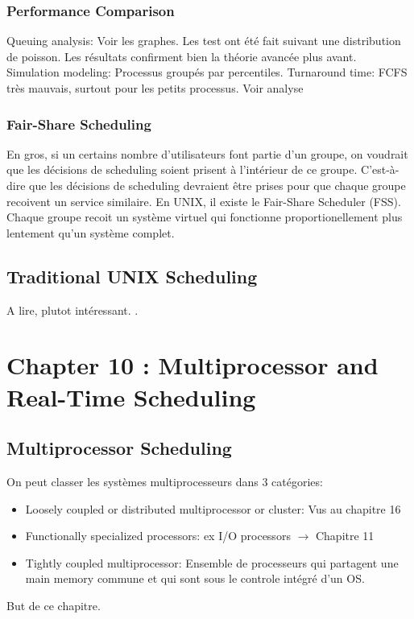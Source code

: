 \subsubsection{Performance Comparison}
Queuing analysis: Voir les graphes.
Les test ont été fait suivant une distribution de poisson.
Les résultats confirment bien la théorie avancée plus avant.
Simulation modeling: Processus groupés par percentiles.
Turnaround time: FCFS très mauvais, surtout pour les petits processus.
Voir analyse \cite[p.~420]{stallings}

\subsubsection{Fair-Share Scheduling}
En gros, si un certains nombre d'utilisateurs font partie d'un groupe, on voudrait que les décisions de scheduling soient prisent à l'intérieur de ce groupe.
C'est-à-dire que les décisions de scheduling devraient être prises pour que chaque groupe recoivent un service similaire.
En UNIX, il existe le Fair-Share Scheduler (FSS).
Chaque groupe recoit un système virtuel qui fonctionne proportionellement plus lentement qu'un système complet.

\subsection{Traditional UNIX Scheduling}
A lire, plutot intéressant.
\cite[p.~423]{stallings}.

\newpage


\section{Chapter 10 : Multiprocessor and Real-Time Scheduling}

\subsection{Multiprocessor Scheduling}
On peut classer les systèmes multiprocesseurs dans 3 catégories:
\begin{itemize}
  \item Loosely coupled or distributed multiprocessor or cluster: Vus au chapitre 16
  \item Functionally specialized processors: ex I/O processors $\to$ Chapitre 11
  \item Tightly coupled multiprocessor: Ensemble de processeurs qui partagent une main memory commune et qui sont sous le controle intégré d'un OS.
\end{itemize}
But de ce chapitre.

